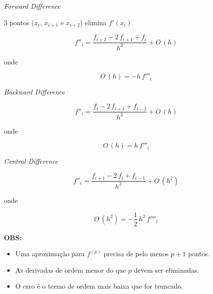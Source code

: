 \begin{enumerar}
\begin{enumerar}
\item \textit{Forward Difference}

3 pontos ($x_{i}$, $x_{i+1}$ e $x_{i+2}$) elimina $f'(x_{i})$

\[
 f''_i = \frac{f_{i+2} - 2\,f_{i+1} + f_i}{h^2} + O\,(h)
\]

onde

\[
 O\,(h) = -h\,f'''_i
\]

\item \textit{Backward Difference}

\[
 f''_i = \frac{f_i - 2\,f_{i+1} + f_{i-2}}{h^2} + O\,(h)
\]

onde

\[
 O\,(h) = h\,f'''_i
\]

\item \textit{Central Difference}

\[
 f''_i = \frac{f_{i+1} - 2\,f_i + f_{i-1}}{h^2} + O\,(h^2)
\]

onde

\[
 O\,(h^2) = -\frac{1}{2}\,h^2\,f''''_i
\]

\end{enumerar}

\end{enumerar}

\textbf{OBS:}

\begin{itemize}
 \item Uma aproximação para $f^{(p)}$ precisa de pelo menos $p+1$ pontos.

\item As derivadas de ordem menor do que $p$ devem ser eliminadas.

\item O erro é o termo de ordem mais baixa que for truncado.

\end{itemize}

